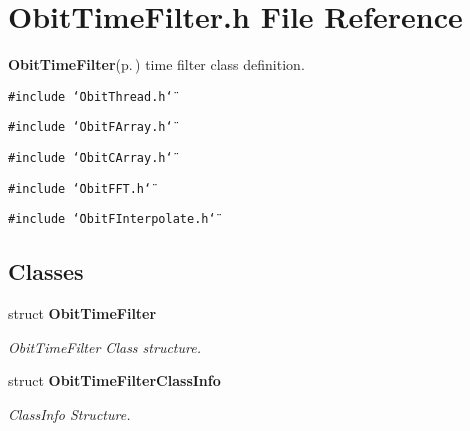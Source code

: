 \section{Obit\-Time\-Filter.h File Reference}
\label{ObitTimeFilter_8h}
{\bf Obit\-Time\-Filter}{\rm (p.\,\pageref{structObitTimeFilter})} time filter class definition. 

{\tt \#include \char`\"{}Obit\-Thread.h\char`\"{}}\par
{\tt \#include \char`\"{}Obit\-FArray.h\char`\"{}}\par
{\tt \#include \char`\"{}Obit\-CArray.h\char`\"{}}\par
{\tt \#include \char`\"{}Obit\-FFT.h\char`\"{}}\par
{\tt \#include \char`\"{}Obit\-FInterpolate.h\char`\"{}}\par
\subsection*{Classes}
\begin{CompactItemize}
\item 
struct {\bf Obit\-Time\-Filter}
\begin{CompactList}\small\item\em Obit\-Time\-Filter Class structure. \item\end{CompactList}\item 
struct {\bf Obit\-Time\-Filter\-Class\-Info}
\begin{CompactList}\small\item\em Class\-Info Structure. \item\end{CompactList}\end{CompactItemize}
